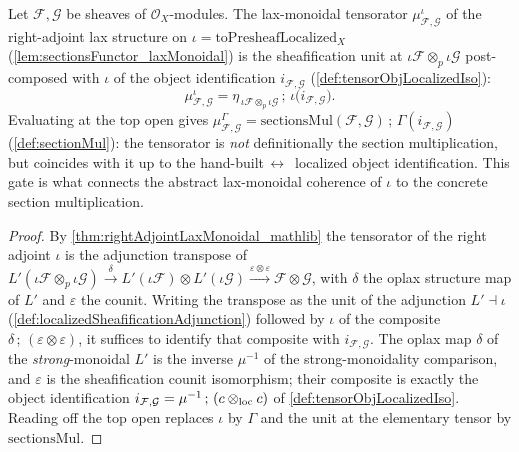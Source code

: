 \begin{lemma}
  \label{lem:sectionsMul_eq_laxTensorator}
  Let \(\mathcal{F},\mathcal{G}\) be sheaves of \(\mathcal{O}_X\)-modules. The
  lax-monoidal tensorator \(\mu^{\iota}_{\mathcal{F},\mathcal{G}}\) of the
  right-adjoint lax structure on \(\iota = \mathrm{toPresheafLocalized}_X\)
  (\cref{lem:sectionsFunctor_laxMonoidal}) is the sheafification unit at
  \(\iota\mathcal{F} \otimes_p \iota\mathcal{G}\) post-composed with \(\iota\) of
  the object identification \(i_{\mathcal{F},\mathcal{G}}\)
  (\cref{def:tensorObjLocalizedIso}):
  \[
    \mu^{\iota}_{\mathcal{F},\mathcal{G}}
      = \eta_{\,\iota\mathcal{F} \otimes_p \iota\mathcal{G}} \,;\,
        \iota\bigl(i_{\mathcal{F},\mathcal{G}}\bigr).
  \]
  Evaluating at the top open gives
  \(\mu^{\Gamma}_{\mathcal{F},\mathcal{G}} =
  \mathrm{sectionsMul}(\mathcal{F},\mathcal{G}) \,;\,
  \Gamma(i_{\mathcal{F},\mathcal{G}})\)
  (\cref{def:sectionMul}): the tensorator is \emph{not} definitionally the section
  multiplication, but coincides with it up to the hand-built\,\(\leftrightarrow\)\,
  localized object identification. This gate is what connects the abstract
  lax-monoidal coherence of \(\iota\) to the concrete section multiplication.
\end{lemma}

\begin{proof}
  By \cref{thm:rightAdjointLaxMonoidal_mathlib} the tensorator of the right adjoint
  \(\iota\) is the adjunction transpose of
  \(L'(\iota\mathcal{F} \otimes_p \iota\mathcal{G})
  \xrightarrow{\delta} L'(\iota\mathcal{F}) \otimes L'(\iota\mathcal{G})
  \xrightarrow{\varepsilon \otimes \varepsilon}
  \mathcal{F} \otimes \mathcal{G}\), with \(\delta\) the oplax structure map of
  \(L'\) and \(\varepsilon\) the counit. Writing the transpose as the unit of the
  adjunction \(L' \dashv \iota\) (\cref{def:localizedSheafificationAdjunction})
  followed by \(\iota\) of the composite \(\delta \,;\,
  (\varepsilon \otimes \varepsilon)\), it suffices to identify that composite with
  \(i_{\mathcal{F},\mathcal{G}}\). The oplax map \(\delta\) of the
  \emph{strong}-monoidal \(L'\) is the inverse \(\mu^{-1}\) of the
  strong-monoidality comparison, and \(\varepsilon\) is the sheafification counit
  isomorphism; their composite is exactly the object identification
  \(i_{\mathcal{F},\mathcal{G}} = \mu^{-1}\,;\,(c \mathbin{\otimes_{\mathrm{loc}}} c)\) of
  \cref{def:tensorObjLocalizedIso}. Reading off the top open replaces \(\iota\) by
  \(\Gamma\) and the unit at the elementary tensor by \(\mathrm{sectionsMul}\).
\end{proof}


